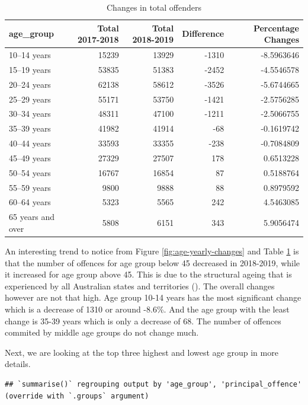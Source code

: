\documentclass[11pt,a4paper,]{article}
\begin{document}
\begin{table}[H]

\caption{\label{tab:summary-table}Changes in total offenders}
\centering
\begin{tabular}[t]{l|r|r|r|r}
\hline
age\_group & Total 2017-2018 & Total 2018-2019 & Difference & Percentage Changes\\
\hline
10–14 years & 15239 & 13929 & -1310 & -8.5963646\\
\hline
15–19 years & 53835 & 51383 & -2452 & -4.5546578\\
\hline
20–24 years & 62138 & 58612 & -3526 & -5.6744665\\
\hline
25–29 years & 55171 & 53750 & -1421 & -2.5756285\\
\hline
30–34 years & 48311 & 47100 & -1211 & -2.5066755\\
\hline
35–39 years & 41982 & 41914 & -68 & -0.1619742\\
\hline
40–44 years & 33593 & 33355 & -238 & -0.7084809\\
\hline
45–49 years & 27329 & 27507 & 178 & 0.6513228\\
\hline
50–54 years & 16767 & 16854 & 87 & 0.5188764\\
\hline
55–59 years & 9800 & 9888 & 88 & 0.8979592\\
\hline
60–64 years & 5323 & 5565 & 242 & 4.5463085\\
\hline
65 years and over & 5808 & 6151 & 343 & 5.9056474\\
\hline
\end{tabular}
\end{table}

An interesting trend to notice from Figure \ref{fig:age-yearly-changes} and Table \ref{tab:summary-table} is that the number of offences for age group below 45 decreased in 2018-2019, while it increased for age group above 45. This is due to the structural ageing that is experienced by all Australian states and territories (\textcite{AIC}). The overall changes however are not that high. Age group 10-14 years has the most significant change which is a decrease of 1310 or around -8.6\%. And the age group with the least change is 35-39 years which is only a decrease of 68. The number of offences commited by middle age groups do not change much.

Next, we are looking at the top three highest and lowest age group in more details.

\begin{verbatim}
## `summarise()` regrouping output by 'age_group', 'principal_offence' (override with `.groups` argument)
\end{verbatim}
\end{document}
